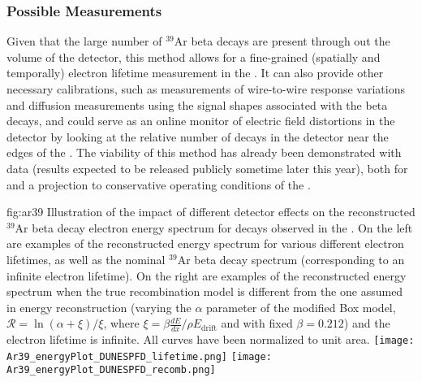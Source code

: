 \subsubsection{Possible Measurements}
Given that the large number of ${}^{39}$Ar beta decays are present through out the volume of the detector, this method allows for a fine-grained (spatially and temporally) electron lifetime measurement in the . %
 It can also provide other necessary calibrations, such as measurements of wire-to-wire response variations and diffusion measurements using the signal shapes associated with the beta decays, and could serve as an online monitor of electric field distortions in the detector by looking at the relative number of decays in the detector near the edges of the . The viability of this method has already been demonstrated with  data (results expected to be released publicly sometime later this year), both for  and a projection to conservative operating conditions of the . %

\begin{dunefigure}{fig:ar39}
{Illustration of the impact of different detector effects on the reconstructed ${}^{39}$Ar  beta decay electron energy spectrum for decays observed in the .  On the left are examples of the reconstructed energy spectrum for various different electron lifetimes, as well as the nominal ${}^{39}$Ar  beta decay spectrum (corresponding to an infinite electron lifetime).  On the right are examples of the reconstructed energy spectrum when the true recombination model is different from the one assumed in energy reconstruction (varying the $\alpha$ parameter of the modified Box model, $\mathcal{R} = \ln(\alpha + \xi)/\xi$, where $\xi = \beta\frac{dE}{dx}/{\rho}E_{\mathrm{drift}}$ and with fixed $\beta = 0.212$) and the electron lifetime is infinite.  All curves have been normalized to unit area.}
\texttt{[image: Ar39\_energyPlot\_DUNESPFD\_lifetime.png]}
\texttt{[image: Ar39\_energyPlot\_DUNESPFD\_recomb.png]}
\end{dunefigure}

